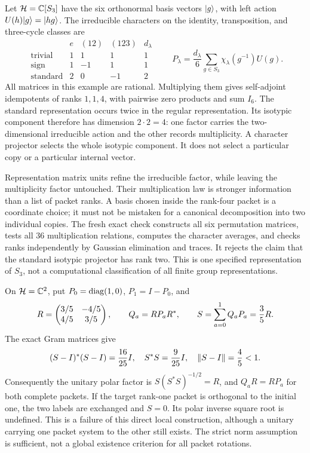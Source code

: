 Let $\mathcal H=\mathbb C[S_3]$ have the six orthonormal basis vectors $\lvert g\rangle$, with left action $U(h)\lvert g\rangle=\lvert hg\rangle$. The irreducible characters on the identity, transposition, and three-cycle classes are
\[
\begin{array}{c|rrr|r}
 & e & (12)&(123)&d_\lambda\\\hline
\text{trivial}&1&1&1&1\\
\text{sign}&1&-1&1&1\\
\text{standard}&2&0&-1&2
\end{array}
\qquad
P_\lambda=\frac{d_\lambda}{6}\sum_{g\in S_3}\chi_\lambda(g^{-1})U(g).
\]
All matrices in this example are rational. Multiplying them gives self-adjoint idempotents of ranks $1,1,4$, with pairwise zero products and sum $I_6$.
The standard representation occurs twice in the regular representation. Its isotypic component therefore has dimension $2\cdot2=4$: one factor carries the two-dimensional irreducible action and the other records multiplicity. A character projector selects the whole isotypic component. It does not select a particular copy or a particular internal vector.

Representation matrix units refine the irreducible factor, while leaving the multiplicity factor untouched. Their multiplication law is stronger information than a list of packet ranks. A basis chosen inside the rank-four packet is a coordinate choice; it must not be mistaken for a canonical decomposition into two individual copies.
The fresh exact check constructs all six permutation matrices, tests all $36$ multiplication relations, computes the character averages, and checks ranks independently by Gaussian elimination and traces. It rejects the claim that the standard isotypic projector has rank two. This is one specified representation of $S_3$, not a computational classification of all finite group representations.

On $\mathcal H=\mathbb C^2$, put $P_0=\operatorname{diag}(1,0)$, $P_1=I-P_0$, and
\[
R=\begin{pmatrix}3/5&-4/5\\4/5&3/5\end{pmatrix},\qquad Q_a=RP_aR^*,
\qquad S=\sum_{a=0}^1Q_aP_a=\frac35R.
\]
The exact Gram matrices give
\[
(S-I)^*(S-I)=\frac{16}{25}I,\quad S^*S=\frac9{25}I,
\quad\left\lVert S-I\right\rVert=\frac45<1.
\]
Consequently the unitary polar factor is $S(S^*S)^{-1/2}=R$, and $Q_aR=RP_a$ for both complete packets.
If the target rank-one packet is orthogonal to the initial one, the two labels are exchanged and $S=0$. Its polar inverse square root is undefined. This is a failure of this direct local construction, although a unitary carrying one packet system to the other still exists. The strict norm assumption is sufficient, not a global existence criterion for all packet rotations.

